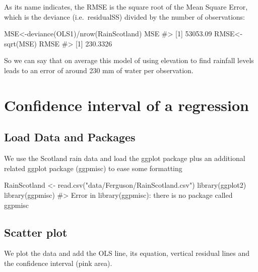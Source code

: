 \documentclass[
  letterpaper,
  DIV=11,
  numbers=noendperiod]{scrreprt}
\newenvironment{Shaded}{\begin{snugshade}}{\end{snugshade}}
\newcommand{\CommentTok}[1]{\textcolor[rgb]{0.37,0.37,0.37}{#1}}
\newcommand{\FunctionTok}[1]{\textcolor[rgb]{0.28,0.35,0.67}{#1}}
\newcommand{\NormalTok}[1]{\textcolor[rgb]{0.00,0.23,0.31}{#1}}
\newcommand{\OtherTok}[1]{\textcolor[rgb]{0.00,0.23,0.31}{#1}}
\newcommand{\SpecialCharTok}[1]{\textcolor[rgb]{0.37,0.37,0.37}{#1}}
\newcommand{\StringTok}[1]{\textcolor[rgb]{0.13,0.47,0.30}{#1}}
\begin{document}
As its name indicates, the RMSE is the square root of the Mean Square
Error, which is the deviance (i.e.~residualSS) divided by the number of
observations:

\begin{Shaded}
\begin{Highlighting}[]
\NormalTok{MSE}\OtherTok{\textless{}{-}}\FunctionTok{deviance}\NormalTok{(OLS1)}\SpecialCharTok{/}\FunctionTok{nrow}\NormalTok{(RainScotland)}
\NormalTok{MSE}
\CommentTok{\#\textgreater{} [1] 53053.09}
\NormalTok{RMSE}\OtherTok{\textless{}{-}}\FunctionTok{sqrt}\NormalTok{(MSE)}
\NormalTok{RMSE}
\CommentTok{\#\textgreater{} [1] 230.3326}
\end{Highlighting}
\end{Shaded}

So we can say that on average this model of using elevation to find
rainfall levels leads to an error of around 230 mm of water per
observation.

\chapter{Confidence interval of a
regression}\label{confidence-interval-of-a-regression}

\section{Load Data and Packages}\label{load-data-and-packages}

We use the Scotland rain data and load the ggplot package plus an
additional related ggplot package (ggpmisc) to ease some formatting

\begin{Shaded}
\begin{Highlighting}[]
\NormalTok{RainScotland }\OtherTok{\textless{}{-}} \FunctionTok{read.csv}\NormalTok{(}\StringTok{"data/Ferguson/RainScotland.csv"}\NormalTok{)}
\FunctionTok{library}\NormalTok{(ggplot2)}
\FunctionTok{library}\NormalTok{(ggpmisc)}
\CommentTok{\#\textgreater{} Error in library(ggpmisc): there is no package called \textquotesingle{}ggpmisc\textquotesingle{}}
\end{Highlighting}
\end{Shaded}

\section{Scatter plot}\label{scatter-plot}

We plot the data and add the OLS line, its equation, vertical residual
lines and the confidence interval (pink area).
\end{document}
